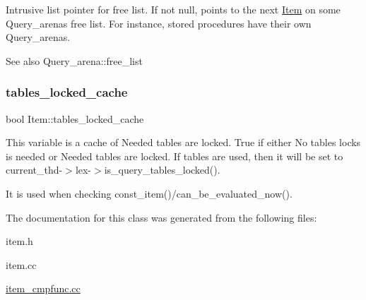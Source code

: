 Intrusive list pointer for free list. If not null, points to the next \mbox{\hyperlink{classItem}{Item}} on some Query\+\_\+arena\textquotesingle{}s free list. For instance, stored procedures have their own Query\+\_\+arena\textquotesingle{}s.

\begin{DoxySeeAlso}{See also}
Query\+\_\+arena\+::free\+\_\+list 
\end{DoxySeeAlso}
\mbox{\label{classItem_a57b1fecae2dda2c06aca6754460b5894}} 
\subsubsection{\texorpdfstring{tables\+\_\+locked\+\_\+cache}{tables\_locked\_cache}}
{\footnotesize\ttfamily bool Item\+::tables\+\_\+locked\+\_\+cache\hspace{0.3cm}{\ttfamily [protected]}}

This variable is a cache of \textquotesingle{}Needed tables are locked\textquotesingle{}. True if either \textquotesingle{}No tables locks is needed\textquotesingle{} or \textquotesingle{}Needed tables are locked\textquotesingle{}. If tables are used, then it will be set to current\+\_\+thd-\/$>$lex-\/$>$is\+\_\+query\+\_\+tables\+\_\+locked().

It is used when checking const\+\_\+item()/can\+\_\+be\+\_\+evaluated\+\_\+now(). 

The documentation for this class was generated from the following files\+:\begin{DoxyCompactItemize}
\item 
item.\+h\item 
item.\+cc\item 
\mbox{\hyperlink{item__cmpfunc_8cc}{item\+\_\+cmpfunc.\+cc}}\end{DoxyCompactItemize}
